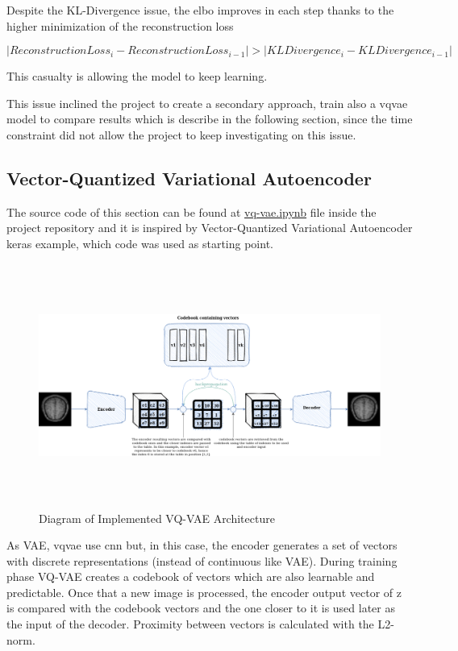 Despite the KL-Divergence issue, the \acrshort*{elbo} improves in each step thanks to the higher minimization of the reconstruction loss

\begin{equation}
    \left\lvert Reconstruction Loss_i - Reconstruction Loss_{i-1} \right\rvert > \left\lvert KL Divergence_i - KL Divergence_{i-1} \right\rvert
\end{equation}
 
This casualty is allowing the model to keep learning.

This issue inclined the project to create a secondary approach, train also a \acrshort*{vqvae} model to compare results which is describe in the following section, since the time constraint did not allow the project to keep investigating on this issue.

\subsection{Vector-Quantized Variational Autoencoder}

The source code of this section can be found at \href{https://github.com/mtablado/uoc2022_tfm/blob/main/vq-vae.ipynb}{vq-vae.ipynb} file inside the project repository and it is inspired by Vector-Quantized Variational Autoencoder \cite{vqvaekeras} keras example, which code was used as starting point.

\begin{figure}[ht]
    \centering
    \includegraphics[width = 16cm, height = 8cm]{images/vq-vae.png}
    \caption[Diagram of Implemented VQ-VAE Architecture]{Diagram of Implemented VQ-VAE Architecture}
    \label{fig:vqvaearch}
\end{figure}

As VAE, \acrshort*{vqvae} use \acrshort*{cnn} but, in this case, the encoder generates a set of vectors with discrete representations (instead of continuous like VAE). During training phase VQ-VAE creates a codebook of vectors which are also learnable and predictable. Once that a new image is processed, the encoder output vector of z is compared with the codebook vectors and the one closer to it is used later as the input of the decoder. Proximity between vectors is calculated with the L2-norm.

